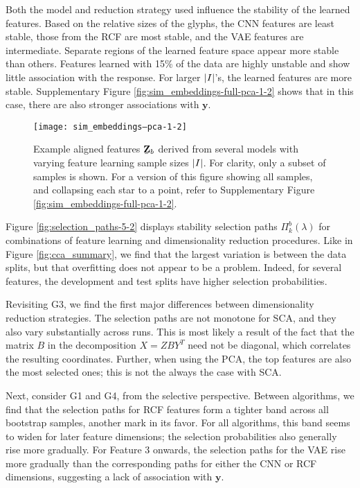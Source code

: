 Both the model and reduction strategy used influence the stability of the
learned features. Based on the relative sizes of the glyphs, the CNN features
are least stable, those from the RCF are most stable, and the VAE features are
intermediate. Separate regions of the learned feature space appear more stable
than others. Features learned with 15\% of the data are highly unstable and show
little association with the response. For larger $\left|I\right|$'s, the learned
features are more stable. Supplementary Figure
\ref{fig:sim_embeddings-full-pca-1-2} shows that in this case, there are also
stronger associations with $\mathbf{y}$.

\begin{figure}
  \centering
  \texttt{[image: sim\_embeddings--pca-1-2]}
  \caption{Example aligned features $\protect\underaccent{\bar}{\mathbf{Z}}_{b}$
    derived from several models with varying feature learning sample sizes
    $\left|I\right|$. For clarity, only a subset of samples is shown. For a version
    of this figure showing all samples, and collapsing each star to a point,
    refer to Supplementary Figure \ref{fig:sim_embeddings-full-pca-1-2}.}
  \label{fig:sim_embeddings-pca-1-2}
\end{figure}

Figure \ref{fig:selection_paths-5-2} displays stability selection paths
$\Pi_{k}^{b}\left(\lambda\right)$ for combinations of feature learning and
dimensionality reduction procedures. Like in Figure \ref{fig:cca_summary}, we
find that the largest variation is between the data splits, but that
overfitting does not appear to be a problem. Indeed, for several features, the
development and test splits have higher selection probabilities.

Revisiting G3, we find the first major differences between dimensionality
reduction strategies. The selection paths are not monotone for SCA, and they
also vary substantially across runs. This is most likely a result of the fact
that the matrix $B$ in the decomposition $X = Z B Y^{T}$ need not be diagonal,
which correlates the resulting coordinates. Further, when using the PCA, the top
features are also the most selected ones; this is not the always the case with
SCA.

Next, consider G1 and G4, from the selective perspective. Between algorithms, we
find that the selection paths for RCF features form a tighter band across all
bootstrap samples, another mark in its favor. For all algorithms, this band
seems to widen for later feature dimensions; the selection probabilities also
generally rise more gradually. For Feature 3 onwards, the selection paths for
the VAE rise more gradually than the corresponding paths for either the CNN or
RCF dimensions, suggesting a lack of association with $\mathbf{y}$.

